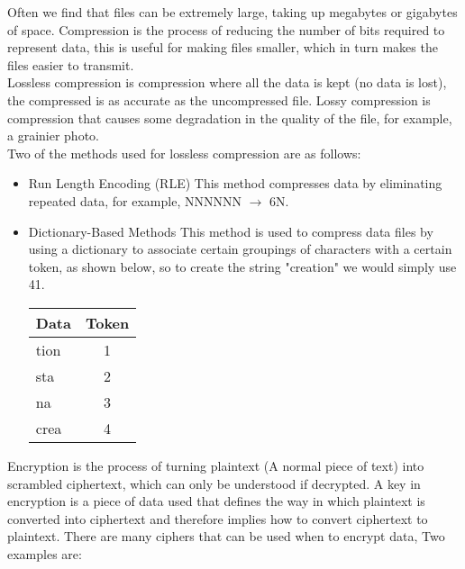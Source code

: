  Often we find that files can be extremely large, taking up megabytes or gigabytes of space. Compression is the process of reducing the number of bits required to represent data, this is useful for making files smaller, which in turn makes the files easier to transmit.\\
  Lossless compression is compression where all the data is kept (no data is lost), the compressed is as accurate as the uncompressed file. Lossy compression is compression that causes some degradation in the quality of the file, for example, a grainier photo.\\
  Two of the methods used for lossless compression are as follows:
  \begin{itemize}
    \setlength{\itemsep}{0em}
    \item Run Length Encoding (RLE)
    \subitem This method compresses data by eliminating repeated data, for example, NNNNNN $\to$ 6N.
    \item Dictionary-Based Methods
    \subitem This method is used to compress data files by using a dictionary to associate certain groupings of characters with a certain token, as shown below, so to create the string "creation" we would simply use 41.
    \begin{table}[H]
      \centering
      \begin{tabular}{ l | c }
        Data & Token \\ \hline
        tion & 1 \\
        sta & 2 \\
        na & 3 \\
        crea & 4
      \end{tabular}
    \end{table}
  \end{itemize}
  Encryption is the process of turning plaintext (A normal piece of text) into scrambled ciphertext, which can only be understood if decrypted. A key in encryption is a piece of data used that defines the way in which plaintext is converted into ciphertext and therefore implies how to convert ciphertext to plaintext. There are many ciphers that can be used when to encrypt data, Two examples are:
